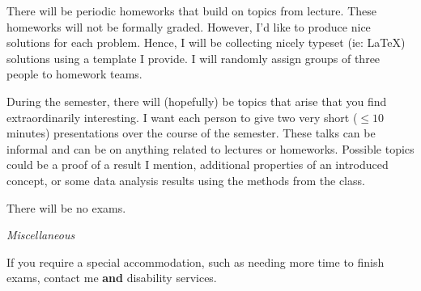 \documentclass[11pt]{article}
\begin{document}
 There will be periodic homeworks that build on topics from lecture.  These homeworks
will not be formally graded.  However, I'd like to produce nice solutions for each problem.  Hence, I will be collecting
nicely typeset (ie: \LaTeX{}) solutions using a template I provide. I will randomly assign groups of three people to homework teams.  

 During the semester, there will (hopefully) be topics that arise that you find extraordinarily 
interesting.  I want each person to give two very short ($\leq 10$ minutes) presentations over the course of the semester.
These talks can be informal and can be on anything related to lectures or homeworks.  Possible topics could be a proof
of a result I mention, additional properties of an introduced concept, or some data analysis results using the methods from the class.
%
%
%

 There will be no exams.
\vskip 13.2pt
\centerline{{\it Miscellaneous}}
If you require a special accommodation, such as needing
more time to finish exams, contact me \textbf{and} disability services.

\end{document}
